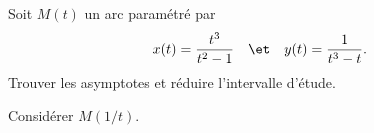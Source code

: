 \begin{enonce}
\begin{exercise}[ID={RMS126 E526},subtitle={Mines-Ponts PSI 2015},tags={}]
Soit $M(t)$ un arc paramétré par
\begin{equation*}
  x(t) = \frac{t^3}{t^2-1} \quad\et\quad y(t)=\frac{1}{t^3-t}.
\end{equation*}
Trouver les asymptotes et réduire l'intervalle d'étude.
\begin{hint}
Considérer $M\left( 1/t \right)$.
\end{hint}
\end{exercise}
\begin{solution}
\end{solution}
\end{enonce}
